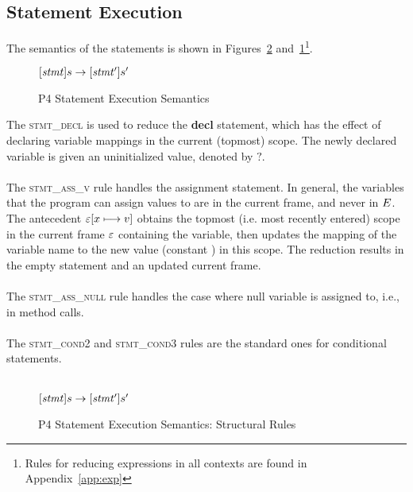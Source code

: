 \documentclass[UTF8]{article}
\begin{document}
   
\subsection{Statement Execution}
The semantics of the statements is shown in Figures~\ref{fig:strsemstmtexec} and~\ref{fig:semstmtexec}\footnote{Rules for reducing expressions in all contexts are found in Appendix~\ref{app:exp}}.

\begin{figure}[ht!]
\begin{ottdefnblock}{$[  \mathit{stmt}  ]  s  \rightarrow  [  \mathit{stmt'}  ]  s'$}{}
\ottusedrule{\ottdrulestmtXXdecl{}}
\ottusedrule{\ottdrulestmtXXassXXv{}}
\ottusedrule{\ottdrulestmtXXcondTwo{}}
\ottusedrule{\ottdrulestmtXXcondThree{}}
\end{ottdefnblock}
\caption{P4 Statement Execution Semantics}
\label{fig:semstmtexec}
\end{figure}
The \textsc{stmt\_decl} is used to reduce the \textbf{decl} statement, which has the effect of declaring variable mappings in the current (topmost) scope. The newly declared variable is given an uninitialized value, denoted by $?$.
\\~\\
The \textsc{stmt\_ass\_v} rule handles the assignment statement. In general, the variables that the program can assign values to are in the current frame, and never in $E$. The antecedent $\varepsilon [ x \longmapsto v ]$ obtains the topmost (i.e. most recently entered) scope in the current frame $\varepsilon$ containing the variable, then updates the mapping of the variable name \vn{} to the new value (constant \cval{}) in this scope. The reduction results in the empty statement and an updated current frame.
\\~\\
The \textsc{stmt\_ass\_null} rule handles the case where null variable is assigned to, i.e., in method calls.
\\~\\
The \textsc{stmt\_cond2} and \textsc{stmt\_cond3} rules are the standard ones for conditional statements.
\\~\\

\begin{figure}[ht!]
\begin{ottdefnblock}{$[  \mathit{stmt}  ]  s  \rightarrow  [  \mathit{stmt'}  ]  s'$}{}
\ottusedrule{\ottdrulestmtXXseqOne{}}
\ottusedrule{\ottdrulestmtXXseqTwo{}}
\ottusedrule{\ottdrulestmtXXblockXXenter{}}
\ottusedrule{\ottdrulestmtXXblockXXexec{}}
\ottusedrule{\ottdrulestmtXXblockXXexit{}}
\end{ottdefnblock}
\caption{P4 Statement Execution Semantics: Structural Rules}
\label{fig:strsemstmtexec}
\end{figure}
\end{document}
